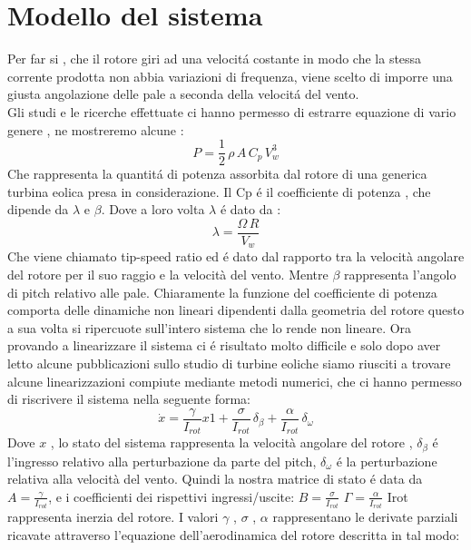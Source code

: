 \documentclass[a4paper,13pt]{article}
\begin{document}
\section{Modello del sistema}
Per far si , che il rotore giri ad una velocit\'a costante in modo che la stessa corrente prodotta non abbia variazioni di frequenza, viene scelto di imporre una giusta angolazione delle pale a seconda della velocit\'a del vento.\\
Gli studi e le ricerche effettuate ci hanno permesso di estrarre equazione di vario genere , ne mostreremo alcune :
\begin{equation}
P=\frac{1}{2}\,\rho\,A\,C_p\,V_w^3
\end{equation}
Che rappresenta la quantit\'a di potenza assorbita dal rotore di una generica turbina eolica presa in considerazione.
Il Cp \'e il coefficiente di potenza , che dipende da $\lambda$ e $\beta$.
Dove a loro volta $\lambda$ \'e dato da :
\begin{equation}
\lambda=\frac{\Omega\,R}{V_w}
\end{equation}
Che viene chiamato tip-speed ratio ed \'e dato dal rapporto tra la velocità angolare
del rotore per il suo raggio e la velocità del vento.
Mentre $\beta$ rappresenta l'angolo di pitch relativo alle pale.
Chiaramente la funzione del coefficiente di potenza comporta delle dinamiche non 
lineari dipendenti dalla geometria del rotore questo a sua volta si ripercuote sull'intero sistema che lo rende non lineare.  
Ora provando a linearizzare il sistema ci \'e risultato molto difficile e solo dopo aver letto alcune pubblicazioni sullo studio di turbine eoliche siamo riusciti a trovare alcune linearizzazioni compiute mediante metodi numerici, che ci hanno permesso di riscrivere il sistema nella seguente forma:
\begin{equation}
\dot{x}=\frac{\gamma}{I_{rot}}x1+\frac{\sigma}{I_{rot}}\,\delta_\beta+\frac{\alpha}{I_{rot}}\,\delta_\omega
\end{equation}
Dove $x$ , lo stato del sistema rappresenta la velocità angolare del rotore ,
$\delta_\beta$ \'e l'ingresso relativo alla perturbazione da parte del pitch,
$\delta_\omega$ \'e la perturbazione relativa alla velocità del vento.
Quindi la nostra matrice di stato \'e data da $A=\frac{\gamma}{I_{rot}}$,
e i coefficienti dei rispettivi ingressi/uscite:
$B=\frac{\sigma}{I_{rot}}$
$\Gamma=\frac{\alpha}{I_{rot}}$
Irot rappresenta inerzia del rotore.
I valori $\gamma$ , $\sigma$ , $\alpha$ rappresentano le derivate parziali ricavate attraverso 
l'equazione dell'aerodinamica del rotore descritta in tal modo:
\end{document}
